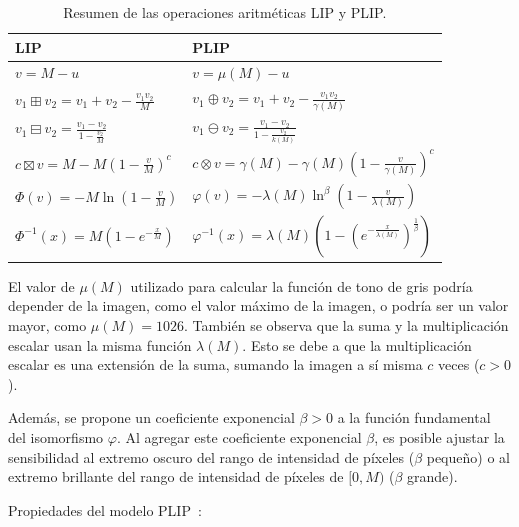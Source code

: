 \begin{table}[h]
	\caption{Resumen de las operaciones aritm\'eticas LIP y PLIP.}
	\begin{center}
		\begin{tabular}{|l|l|}
			\hline 
			\textbf{LIP} & \textbf{PLIP}\\
			\hline
			$v=M-u$ & $v=\mu(M)-u$\\
			\hline
			$v_1\boxplus v_2=v_1+v_2-\frac{v_1v_2}{M}$ & $v_1\oplus v_2=v_1+v_2-\frac{v_1v_2}{\gamma(M)}$\\
			\hline
			$v_1\boxminus v_2=\frac{v_1-v_2}{1-\frac{v_2}{M}}$ & $v_1\ominus v_2=\frac{v_1-v_2}{1-\frac{v_2}{k(M)}}$\\
			\hline
			$c\boxtimes v=M-M(1-\frac{v}{M})^c$ & $c\otimes v=\gamma(M)-\gamma(M)(1-\frac{v}{\gamma(M)})^c$\\
			\hline
			$\varPhi(v)=-M\ln(1-\frac{v}{M})$ & $\varphi(v)=-\lambda(M)\ln^\beta(1-\frac{v}{\lambda(M)})$\\
			\hline
			$\varPhi^{-1}(x)=M\left(1-e^{-\frac{x}{M}}\right)$ & $\varphi^{-1}(x)=\lambda(M)\left(1-\left(e^{-\frac{x}{\lambda(M)}}\right)^{\frac{1}{\beta}}\right)$\\
			\hline
		\end{tabular}
	\end{center}
\end{table}

El valor de $\mu(M)$ utilizado para calcular la función de tono de gris podría depender de la imagen, como el valor máximo de la imagen, o podría ser un valor mayor, como $\mu(M) = 1026$. También se observa que la suma y la multiplicación escalar usan la misma función $\lambda(M)$. Esto se debe a que la multiplicación escalar es una extensión de la suma, sumando la imagen a sí misma $c$ veces ($c>0$).

Además, se propone un coeficiente exponencial $\beta>0$ a la función fundamental del isomorfismo $\varphi$. Al agregar este coeficiente exponencial $\beta$, es posible ajustar la sensibilidad al extremo oscuro del rango de intensidad de píxeles ($\beta$ pequeño) o al extremo brillante del rango de intensidad de píxeles de $[0, M)$ ($\beta$ grande).

Propiedades del modelo PLIP~\cite{panetta2010parameterized}:

